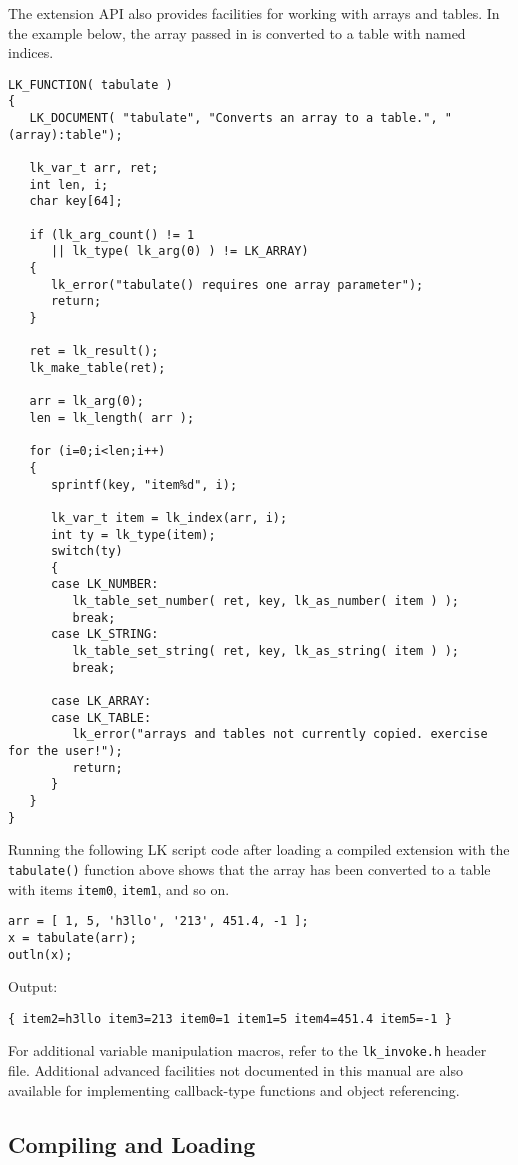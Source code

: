 \documentclass{article}
\begin{document}
The extension API also provides facilities for working with arrays and tables.  In the example below, the array passed in is converted to a table with named indices.

\begin{verbatim}
LK_FUNCTION( tabulate )
{
   LK_DOCUMENT( "tabulate", "Converts an array to a table.", "(array):table");
	
   lk_var_t arr, ret;
   int len, i;
   char key[64];
	
   if (lk_arg_count() != 1
      || lk_type( lk_arg(0) ) != LK_ARRAY)
   {
      lk_error("tabulate() requires one array parameter");
      return;
   }
	
   ret = lk_result();
   lk_make_table(ret);
	
   arr = lk_arg(0);
   len = lk_length( arr );

   for (i=0;i<len;i++)
   {
      sprintf(key, "item%d", i);
		
      lk_var_t item = lk_index(arr, i);
      int ty = lk_type(item);
      switch(ty)
      {
      case LK_NUMBER:
         lk_table_set_number( ret, key, lk_as_number( item ) );
         break;
      case LK_STRING:
         lk_table_set_string( ret, key, lk_as_string( item ) );
         break;
			
      case LK_ARRAY:
      case LK_TABLE:
         lk_error("arrays and tables not currently copied. exercise for the user!");
         return;
      }
   }		
}
\end{verbatim}

Running the following LK script code after loading a compiled extension with the \texttt{tabulate()} function above shows that the array has been converted to a table with items \texttt{item0}, \texttt{item1}, and so on.

\begin{verbatim}
arr = [ 1, 5, 'h3llo', '213', 451.4, -1 ];
x = tabulate(arr);
outln(x);
\end{verbatim}

Output:
\begin{verbatim}
{ item2=h3llo item3=213 item0=1 item1=5 item4=451.4 item5=-1 }
\end{verbatim}


For additional variable manipulation macros, refer to the \texttt{lk\_invoke.h} header file.  Additional advanced facilities not documented in this manual are also available for implementing callback-type functions and object referencing.

\subsection{Compiling and Loading}
\end{document}
